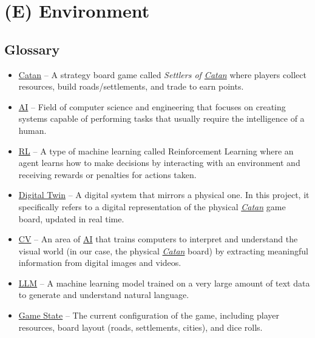 \documentclass{article}
\newcommand{\Catan}{\href{https://en.wikipedia.org/wiki/Catan}{Catan}}
\newcommand{\AI}{\href{https://en.wikipedia.org/wiki/Artificial_intelligence}{AI}}
\newcommand{\RL}{\href{https://www.ibm.com/think/topics/reinforcement-learning}{RL}}
\newcommand{\DigitalTwin}{\href{https://en.wikipedia.org/wiki/Digital_twin}{Digital Twin}}
\newcommand{\CV}{\href{https://www.ibm.com/think/topics/computer-vision}{CV}}
\newcommand{\LLM}{\href{https://www.cloudflare.com/learning/ai/what-is-large-language-model/}{LLM}}
\newcommand{\GameState}{\href{https://milvus.io/ai-quick-reference/what-is-a-state-in-rl}{Game State}}
\begin{document}
\newpage{}



\section*{(E) Environment}\label{sec:srs-environment}
\renewcommand{\thesubsection}{E.\arabic{subsection}}
\setcounter{subsection}{0}

\subsection{Glossary}\label{subsec:glossary}
\begin{itemize}
    \item {\Catan{}} – A strategy board game called \textit{Settlers of \emph{\Catan{}}} where players collect resources, build roads/settlements, and trade to earn points.
    \item {\AI{}} – Field of computer science and engineering that focuses on creating systems capable of performing tasks that usually require the intelligence of a human.
    \item {\RL{}} – A type of machine learning called Reinforcement Learning where an agent learns how to make decisions by interacting with an environment and receiving rewards or penalties for actions taken.
    \item {\DigitalTwin{}} – A digital system that mirrors a physical one. In this project, it specifically refers to a digital representation of the physical \emph{\Catan{}} game board, updated in real time.
    \item {\CV{}} – An area of \AI{} that trains computers to interpret and understand the visual world (in our case, the physical \emph{\Catan{}} board) by extracting meaningful information from digital images and videos.
    \item {\LLM{}} – A machine learning model trained on a very large amount of text data to generate and understand natural language.
    \item {\GameState{}} – The current configuration of the game, including player resources, board layout (roads, settlements, cities), and dice rolls.
\end{itemize}
\end{document}
